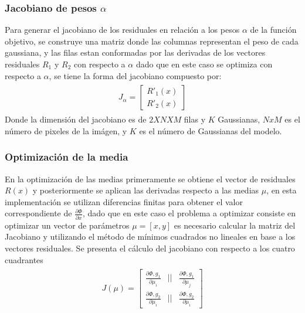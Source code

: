 \subsubsection{Jacobiano de pesos $\alpha$}
Para generar el jacobiano de los residuales en relaci\'on a los pesos $\alpha$ de la funci\'on objetivo, se construye una matriz donde las columnas representan el peso de cada gaussiana, y las filas estan conformadas por las derivadas de los vectores residuales $R_1$ y $R_2$ con respecto a $\alpha$ dado que en este caso se optimiza con respecto a $\alpha$, se tiene la forma del jacobiano compuesto por:
\begin{align*}
\begin{split}
J_{\alpha} = \begin{bmatrix}
	   	R'_1(x) \\    
		R'_2(x)      
           \end{bmatrix}
\end{split}
\end{align*}
Donde la dimensión del jacobiano es de $2XNXM$ filas y $K$ Gaussianas, $NxM$ es el número de pixeles de la imágen, y $K$ es el número de Gaussianas del modelo. 
\subsubsection{Optimizaci\'on de la media}
En la optimización de las medias primeramente se obtiene el vector de residuales $R(x)$ y posteriormente se aplican las derivadas respecto a las medias $\mu$, en esta implementación se utilizan diferencias finitas para obtener el valor correspondiente de $ \frac{\partial \Phi}{\partial x}$, dado que en este caso el problema a optimizar consiste en optimizar un vector de parámetros $\mu = [x, y]$ es necesario calcular la matriz del Jacobiano y utilizando el m\'etodo de m\'inimos cuadrados no lineales en base a los vectores residuales.
Se presenta el c\'alculo del jacobiano con respecto a los cuatro cuadrantes
\begin{align*}
\begin{split}
J(\mu) = \begin{bmatrix}
	   	\frac{\partial \Phi, g_1 }{ \partial \mu_i } & || & \frac{\partial \Phi, g_1 }{ \partial \mu_j } \\    
		\frac{\partial \Phi, g_2 }{ \partial \mu_i } & || & \frac{\partial \Phi, g_2 }{ \partial \mu_i }    
           \end{bmatrix}
\end{split}
\end{align*}
